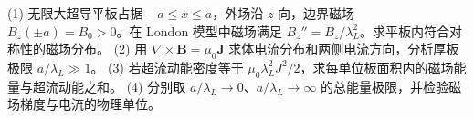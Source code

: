 (1) 无限大超导平板占据 \(-a\le x\le a\)，外场沿 \(z\) 向，边界磁场 \(B_z(\pm a)=B_0>0\)。在 London 模型中磁场满足 \(B_z''=B_z/\lambda_L^2\)。求平板内符合对称性的磁场分布。
(2) 用 \(\nabla\times\mathbf B=\mu_0\mathbf J\) 求体电流分布和两侧电流方向，分析厚板极限 \(a/\lambda_L\gg1\)。
(3) 若超流动能密度等于 \(\mu_0\lambda_L^2J^2/2\)，求每单位板面积内的磁场能量与超流动能之和。
(4) 分别取 \(a/\lambda_L\to0\)、\(a/\lambda_L\to\infty\) 的总能量极限，并检验磁场梯度与电流的物理单位。
